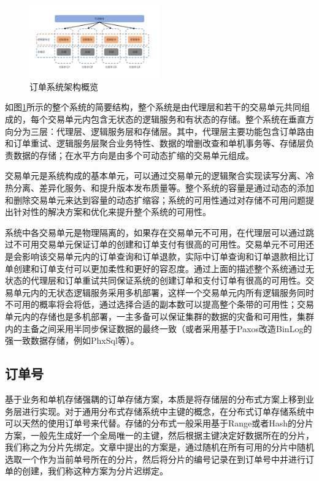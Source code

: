 \documentclass[letterpaper,twocolumn,10pt]{article}
\begin{document}
\begin{figure}[htbp]
\begin{center}
\includegraphics[width=0.5\textwidth]{./figure_1.png}
\caption{订单系统架构概览}
\label{Figure1}
\end{center}
\end{figure}

如图\ref{Figure1}所示的整个系统的简要结构，整个系统是由代理层和若干的交易单元共同组成的，每个交易单元内包含无状态的逻辑服务和有状态的存储。整个系统在垂直方向分为三层：代理层、逻辑服务层和存储层。其中，代理层主要功能包含订单路由和订单重试、逻辑服务层聚合业务特性、数据的增删改查和单机事务等、存储层负责数据的存储；在水平方向是由多个可动态扩缩的交易单元组成。

交易单元是系统构成的基本单元，可以通过交易单元的逻辑聚合实现读写分离、冷热分离、差异化服务、和提升版本发布质量等。整个系统的容量是通过动态的添加和删除交易单元来达到容量的动态扩缩容；系统的可用性通过对存储不可用问题提出针对性的解决方案和优化来提升整个系统的可用性。

系统中各交易单元是物理隔离的，如果存在交易单元不可用，在代理层可以通过跳过不可用交易单元保证订单的创建和订单支付有很高的可用性。交易单元不可用还是会影响该交易单元内的订单查询和订单退款，实际中订单查询和订单退款相比订单创建和订单支付可以更加柔性和更好的容忍度。通过上面的描述整个系统通过无状态的代理层和订单重试共同保证系统的创建订单和支付订单有很高的可用性。交易单元内的无状态逻辑服务采用多机部署，这样一个交易单元内所有逻辑服务同时不可用的概率将会将低，通过选择合适的副本数可以提高整个条带的可用性；交易单元内的存储也是多机部署，一主多备可以保证集群的数据的灾备和可用性，集群内的主备之间采用半同步保证数据的最终一致（或者采用基于Paxos改造BinLog的强一致数据存储，例如PhxSql等）。


\subsection{订单号}
基于业务和单机存储强耦的订单存储方案，本质是将存储层的分布式方案上移到业务层进行实现。对于通用分布式存储系统中主键的概念，在分布式订单存储系统中可以天然的使用订单号来代替。存储的分布式一般采用基于Range或者Hash的分片方案，一般先生成好一个全局唯一的主键，然后根据主键决定好数据所在的分片，我们称之为分片先绑定。文章中提出的方案是，通过随机在所有可用的分片中随机选取一个作为当前单号所在的分片，然后将分片的编号记录在到订单号中并进行订单的创建，我们称这种方案为分片迟绑定。
\end{document}
